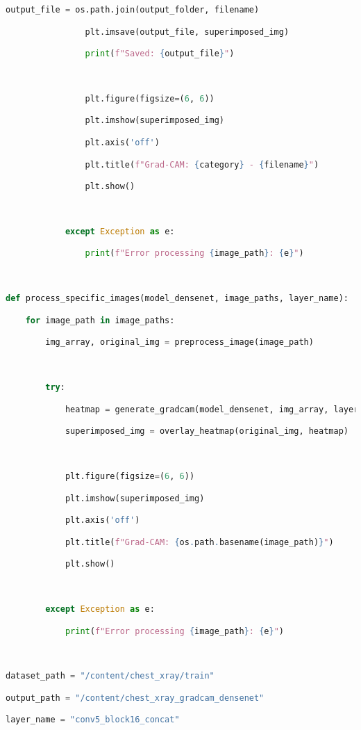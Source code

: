 \documentclass{article}
\begin{document}
\begin{lstlisting}[style=mystyle,language=Python]
                output_file = os.path.join(output_folder, filename)

                plt.imsave(output_file, superimposed_img)

                print(f"Saved: {output_file}")



                plt.figure(figsize=(6, 6))

                plt.imshow(superimposed_img)

                plt.axis('off')

                plt.title(f"Grad-CAM: {category} - {filename}")

                plt.show()



            except Exception as e:

                print(f"Error processing {image_path}: {e}")



def process_specific_images(model_densenet, image_paths, layer_name):

    for image_path in image_paths:

        img_array, original_img = preprocess_image(image_path)



        try:

            heatmap = generate_gradcam(model_densenet, img_array, layer_name)

            superimposed_img = overlay_heatmap(original_img, heatmap)



            plt.figure(figsize=(6, 6))

            plt.imshow(superimposed_img)

            plt.axis('off')

            plt.title(f"Grad-CAM: {os.path.basename(image_path)}")

            plt.show()



        except Exception as e:

            print(f"Error processing {image_path}: {e}")



dataset_path = "/content/chest_xray/train"

output_path = "/content/chest_xray_gradcam_densenet"

layer_name = "conv5_block16_concat"




\end{lstlisting}
\end{document}
